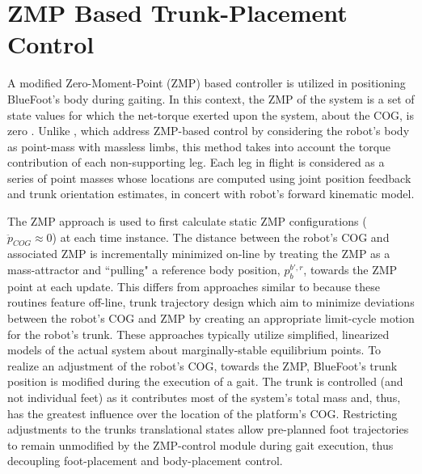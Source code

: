 	\section{ZMP Based Trunk-Placement Control}

		A  modified Zero-Moment-Point (ZMP) based controller is utilized in positioning BlueFoot's body during gaiting. In this context, the ZMP of the system is a set of state values for which the net-torque exerted upon the system, about the COG, is zero \cite{Kajita2003,Katie2009}. Unlike \cite{Takanishi1989,Kurazume2003}, which address ZMP-based control by considering the robot's body as point-mass with massless limbs, this method takes into account the torque contribution of each non-supporting leg. Each leg in flight is considered as a series of point masses whose locations are computed using joint position feedback and trunk orientation estimates, in concert with robot's forward kinematic model.
		
		The ZMP approach is used to first calculate static ZMP configurations ( \IE $\ddot{p}_{COG}\approx0$) at each time instance. The distance between the robot's COG and associated ZMP is incrementally minimized on-line by treating the ZMP as a  mass-attractor and ``pulling" a reference body position, ${p}_{b}^{b',r}$, towards the ZMP point at each update. This differs from approaches similar to \cite{Kurazume2003} because these routines feature off-line, trunk trajectory design which aim to minimize deviations between the robot's COG and ZMP by creating an appropriate limit-cycle motion for the robot's trunk. These approaches typically utilize simplified, linearized models of the actual system about marginally-stable equilibrium points. To realize an adjustment of the robot's COG, towards the ZMP, BlueFoot's trunk position is modified during the execution of a gait. The trunk is controlled (and not individual feet) as it contributes most of the system's total mass and, thus, has the greatest influence over the location of the platform's COG. Restricting adjustments to the trunks translational states allow pre-planned foot trajectories to remain unmodified by the ZMP-control module during gait execution, thus decoupling foot-placement and body-placement control.

